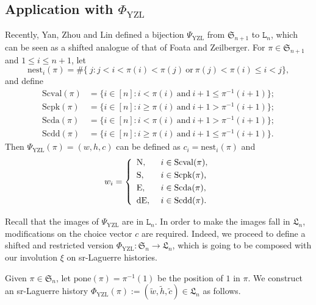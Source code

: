 \documentclass[12pt]{amsart}
\numberwithin{equation}{section}
\theoremstyle{plain}
\theoremstyle{definition}
\def\YZL{\mathrm{YZL}}
\def\SS{\mathfrak{S}}
\def\LH{\mathfrak{L}}
\def\N{\mathrm{N}}
\def\S{\mathrm{S}}
\def\E{\mathrm{E}}
\def\dE{\mathrm{dE}}
\def\Scpk{\mathrm{Scpk}}
\def\Scval{\mathrm{Scval}}
\def\Scda{\mathrm{Scda}}
\def\Scdd{\mathrm{Scdd}}
\def\pone{\mathrm{pone}}
\def\nest{\mathrm{nest}}
\begin{document}
\subsection{Application with \texorpdfstring{$\Phi_{\YZL}$}{Yan-Zhou-Lin's bijection}}\label{subsec:YZL}

Recently, Yan, Zhou and Lin \cite{YZL} defined a bijection
 $\Psi_{\YZL}$ from $\SS_{n+1}$ to $\mathtt{L}_n$, which can be seen as
 a shifted analogue of that of Foata and Zeilberger. For $\pi \in \SS_{n+1}$ and $1\le i\le n+1$, let
 \[\nest_i(\pi)= \# \{~j \colon j <i< \pi(i) < \pi(j)~\text{or}~ \pi(j) < \pi(i) \leq i <j\},\]
 and define
 \begin{align*}
   \Scval(\pi) &= \{i \in [n] \colon  i < \pi(i) ~ \text{and}~  i+1 \leq \pi^{-1}(i+1) \}; \\
   \Scpk(\pi) & =\{i \in [n] \colon i \geq  \pi(i) ~ \text{and}~  i+1 > \pi^{-1}(i+1)\};\\
   \Scda(\pi) & =\{i \in [n] \colon i < \pi(i) ~ \text{and}~  i+1 > \pi^{-1}(i+1)\};\\
   \Scdd(\pi) & =\{i \in [n] \colon i  \geq \pi(i) ~ \text{and}~  i+1 \leq \pi^{-1}(i+1)\}.
 \end{align*}
 Then $\Psi_{\YZL}(\pi)=(w,h,c)$ can be defined as $c_i=\nest_i(\pi)$
 and
 \begin{equation}
 \label{eq:step}
w_i= \left\{
  \begin{array}{ll}
\N, & \mbox{ $ i \in \Scval(\pi)$,}\\[3pt]
\S, & \mbox{  $ i \in \Scpk(\pi)$,} \\[3pt]
\E, & \mbox{  $ i \in \Scda(\pi)$,}\\[3pt]
\dE, & \mbox{  $ i \in \Scdd(\pi)$.}
 \end{array} \right.
\end{equation}

 Recall that the images of $\Psi_{\YZL}$
 are in $\mathtt{L}_n$. In order to make the images fall in $\LH_n$, modifications on the choice vector $c$ are required. Indeed, we proceed to define a shifted and restricted version $\Phi_{\YZL}:\SS_n\to\LH_n$, which is going to be composed with our
 involution $\xi$ on sr-Laguerre histories.

Given $\pi \in \SS_n$, let $\pone(\pi)=\pi^{-1}(1)$ be the position of $1$ in $\pi$.  We construct an sr-Laguerre history $\Phi_{\YZL}(\pi):=(\widetilde{w},\widetilde{h},\widetilde{c}) \in \LH_n$ as follows.
\end{document}

